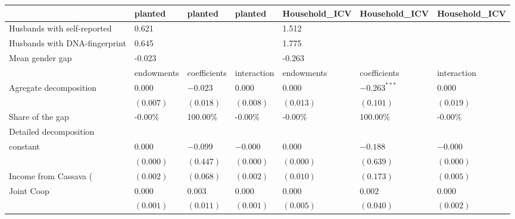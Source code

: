 \begin{tabular}{lllllll}
\toprule
{} &     planted &       planted &      planted & Household_ICV &    Household_ICV & Household_ICV \\
\midrule
Husbands with self-reported             &       0.621 &               &              &         1.512 &                  &               \\
Husbands with DNA-fingerprint           &       0.645 &               &              &         1.775 &                  &               \\
Mean gender gap                         &      -0.023 &               &              &        -0.263 &                  &               \\
                                        &  endowments &  coefficients &  interaction &    endowments &     coefficients &   interaction \\
Agregate decomposition                  &     $0.000$ &      $-0.023$ &      $0.000$ &       $0.000$ &  $-0.263 ^{***}$ &       $0.000$ \\
                                        &   $(0.007)$ &     $(0.018)$ &    $(0.008)$ &     $(0.013)$ &        $(0.101)$ &     $(0.019)$ \\
Share of the gap                        &     -0.00\% &      100.00\% &      -0.00\% &       -0.00\% &         100.00\% &       -0.00\% \\
Detailed decomposition                  &             &               &              &               &                  &               \\
constant                                &     $0.000$ &      $-0.099$ &     $-0.000$ &       $0.000$ &         $-0.188$ &      $-0.000$ \\
                                        &   $(0.000)$ &     $(0.447)$ &    $(0.000)$ &     $(0.000)$ &        $(0.639)$ &     $(0.000)$ \\
Income from Cassava (%
                                        &   $(0.002)$ &     $(0.068)$ &    $(0.002)$ &     $(0.010)$ &        $(0.173)$ &     $(0.005)$ \\
Joint Coop                              &     $0.000$ &       $0.003$ &      $0.000$ &       $0.000$ &          $0.002$ &       $0.000$ \\
                                        &   $(0.001)$ &     $(0.011)$ &    $(0.001)$ &     $(0.005)$ &        $(0.040)$ &     $(0.002)$ \\

\end{tabular}
